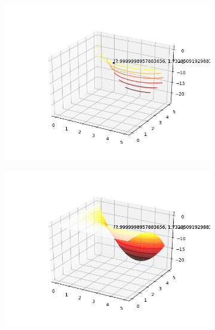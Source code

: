 \documentclass[a4paper, 12pt]{article}
\begin{document}
\begin{figure}[H]
\centering
\begin{subfigure}{0.3\textwidth}
  \centering
  \includegraphics[width=\linewidth]{6/BFGS/contorno.png}
\end{subfigure}%
\begin{subfigure}{0.3\textwidth}
  \centering
  \includegraphics[width=\linewidth]{6/BFGS/superficie.png}
\end{subfigure}
\begin{subfigure}{0.3\textwidth}
  \centering

\end{subfigure}
\end{figure}
\end{document}
